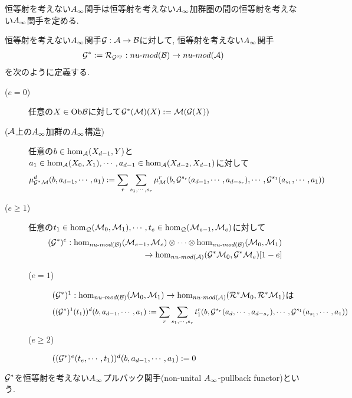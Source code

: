 \documentclass[uplatex, a4paper, 14Q, dvipdfmx]{jsarticle}
\begin{document}
恒等射を考えない$A_{\infty}$関手は恒等射を考えない$A_{\infty}$加群圏の間の恒等射を考えない$A_{\infty}$関手を定める. 

\begin{definition}
  恒等射を考えない$A_{\infty}$関手$\mathcal{G} : \mathcal{A} \to \mathcal{B}$に対して, 恒等射を考えない$A_{\infty}$関手
  \begin{align*}
    \mathcal{G}^\ast := \mathcal{R}_{\mathcal{G}^{\mathrm{op}}} : nu \text{-} mod (\mathcal{B}) \to nu \text{-} mod (\mathcal{A})
  \end{align*}
  を次のように定義する.
  \begin{description}
    \item[($e=0$)] 任意の$X \in \mathrm{Ob}\mathcal{B}$に対して$\mathcal{G}^\ast(\mathcal{M})(X) := \mathcal{M}(\mathcal{G}(X))$
    \item[($\mathcal{A}$上の$A_{\infty}$加群の$A_{\infty}$構造)] 任意の$b \in \hom_{\mathcal{A}}(X_{d-1},Y)$と$a_1 \in \hom_{\mathcal{A}}(X_0,X_1), \cdots, a_{d-1} \in \hom_{\mathcal{A}}(X_{d-2},X_{d-1})$に対して
    \begin{align*}
      \mu^d_{\mathcal{G}^\ast\mathcal{M}}(b,a_{d-1},\cdots,a_1)
      := \sum_{r} \sum_{s_1,\cdots,s_r} \mu^r_{\mathcal{M}} (b,\mathcal{G}^{s_r}(a_{d-1},\cdots,a_{d-s_r}), \cdots, \mathcal{G}^{s_1}(a_{s_1},\cdots,a_1))
    \end{align*}
    \item[($e \geq 1$)] 任意の$t_1 \in \hom_{\mathcal{Q}}(\mathcal{M}_0,\mathcal{M}_1), \cdots, t_e \in \hom_{\mathcal{Q}}(\mathcal{M}_{e-1},\mathcal{M}_e)$に対して
    \begin{align*}
      (\mathcal{G}^\ast)^e : \hom_{nu \text{-} mod (\mathcal{B})}(\mathcal{M}_{e-1},\mathcal{M}_e) \otimes \cdots \otimes \hom_{nu \text{-} mod (\mathcal{B})}(\mathcal{M}_0,\mathcal{M}_1) \\
      \to \hom_{nu \text{-} mod (\mathcal{A})}(\mathcal{G}^\ast \mathcal{M}_0,\mathcal{G}^\ast \mathcal{M}_e)[1-e]
    \end{align*}
    \begin{description}
      \item[($e=1$)] $(\mathcal{G}^\ast)^1: \hom_{nu \text{-} mod (\mathcal{B})} (\mathcal{M}_0,\mathcal{M}_1) \to \hom_{nu \text{-} mod (\mathcal{A})} (\mathcal{R}^\ast \mathcal{M}_0,\mathcal{R}^\ast \mathcal{M}_1)$は
      \begin{align*}
        ((\mathcal{G}^\ast)^1(t_1))^d(b,a_{d-1},\cdots,a_1)
        := \sum_r \sum_{s_1,\cdots,s_r} t_1^r(b, \mathcal{G}^{s_r}(a_d,\cdots,a_{d-s_r}), \cdots, \mathcal{G}^{s_1}(a_{s_1},\cdots,a_1))
      \end{align*}
      \item[($e \geq 2$)] $((\mathcal{G}^\ast)^e(t_e,\cdots,t_1))^d(b,a_{d-1},\cdots,a_1) := 0$
    \end{description}
  \end{description}
  $\mathcal{G}^\ast$を恒等射を考えない$A_{\infty}$プルバック関手(non-unital $A_{\infty}$-pullback functor)という. 
\end{definition}
\end{document}
